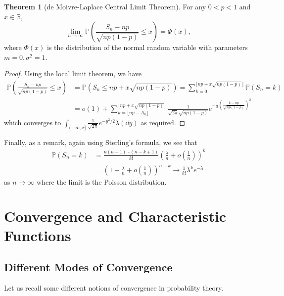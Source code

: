 \documentclass[]{article}
\theoremstyle{definition}
\newtheorem{theorem}{Theorem}
\theoremstyle{definition}
\begin{document}
\begin{theorem}[de Moivre-Laplace Central Limit Theorem]
  For any \(0 < p < 1\) and \(x \in \mathbb{R}\), 
  \[\lim_{n \to \infty} \mathbb{P}\left(\frac{S_n - np}{\sqrt{np(1 - p)}} \le x\right) = \Phi(x),\]
  where \(\Phi(x)\) is the distribution of the normal random variable with parameters 
  \(m = 0, \sigma^2 = 1\).
\end{theorem}
\begin{proof}
  Using the local limit theorem, we have
  \[\begin{split}
    \mathbb{P}\left(\frac{S_n - np}{\sqrt{np(1 - p)}} \le x\right) & = 
    \mathbb{P}(S_n \le np + x\sqrt{np(1 - p)})
     = \sum_{k = 0}^{\lfloor np + x\sqrt{np(1 - p)}\rfloor} \mathbb{P}(S_n = k)\\
      & = o(1) + \sum_{k = \lfloor np - A_n \rfloor}^{\lfloor np + x\sqrt{np(1 - p)}\rfloor}
      \frac{1}{\sqrt{2\pi}\sqrt{np(1 - p)}}e^{-\frac{1}{2}\left(\frac{k - np}{\sqrt{np(1 - p)}}\right)^2}
  \end{split}\]
  which converges to \(\int_{(-\infty, x]} \frac{1}{\sqrt{2\pi}} e^{-y^2 / 2} \lambda(\dd y)\) as 
  required.
\end{proof}

Finally, as a remark, again using Sterling's formula, we see that 
\[\begin{split}
  \mathbb{P}(S_n = k) & = \frac{n(n - 1) \cdots (n - k + 1)}{k!}\left(\frac{\lambda}{n} + o\left(\frac{1}{n}\right)\right)^k\\
  & = \left(1 - \frac{\lambda}{n} + o\left(\frac{1}{n}\right)\right)^{n - k} \to \frac{1}{k!} \lambda^ke^{-\lambda}
\end{split}\]
as \(n \to \infty\) where the limit is the Poisson distribution. 

\newpage
\section{Convergence and Characteristic Functions}

\subsection{Different Modes of Convergence}

Let us recall some different notions of convergence in probability theory.
\end{document}

